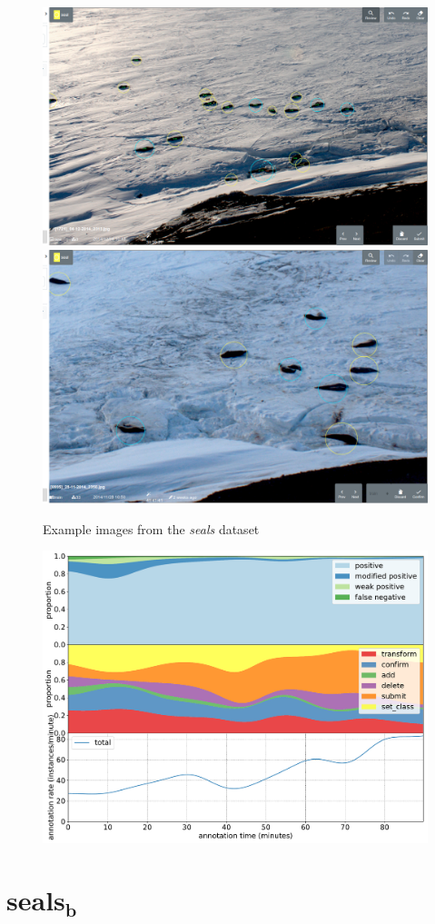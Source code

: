 \begin{figure}[!h]
\centering
  \includegraphics[width=0.475\linewidth]{figures/annotation/screenshots/seals_small2.png}
  \hfill
  \includegraphics[width=0.45\linewidth]{figures/annotation/screenshots/seals_big.png}
  \caption{}
\caption{ Example images from the \emph{seals} dataset}
\label {fig:seals_examples}
\end{figure}

\begin{figure}[!h]
\centering
\includegraphics[width=1.0\linewidth]{charts/action_annotations/seals1.pdf}
\caption{  }
\label{fig:seals_annotation}
\end{figure}

\pagebreak
\section {$\mathbf{seals_b}$}
\label{sec:seals2_details}

